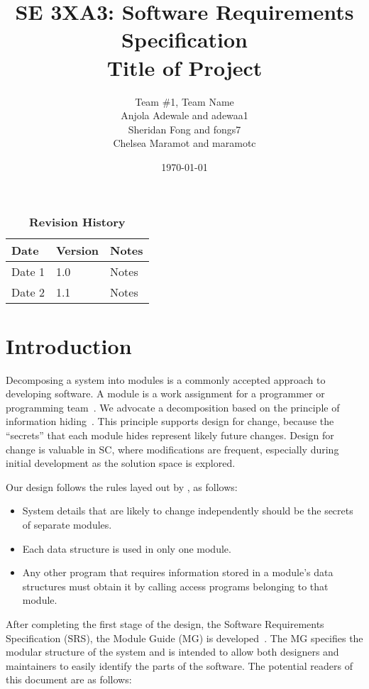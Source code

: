 \documentclass[12pt, titlepage]{article}
\title{SE 3XA3: Software Requirements Specification\\Title of Project}
\author{Team \#1, Team Name
		\\ Anjola Adewale and adewaa1
		\\ Sheridan Fong and fongs7
		\\ Chelsea Maramot and maramotc
}
\date{\today}
\begin{document}
\maketitle

\tableofcontents
\listoftables
\listoffigures

\begin{table}[H]
\caption{\bf Revision History}
\begin{tabularx}{\textwidth}{p{3cm}p{2cm}X}
\toprule {\bf Date} & {\bf Version} & {\bf Notes}\\
\midrule
Date 1 & 1.0 & Notes\\
Date 2 & 1.1 & Notes\\
\bottomrule
\end{tabularx}
\end{table}

\newpage


\section{Introduction}

Decomposing a system into modules is a commonly accepted approach to developing
software.  A module is a work assignment for a programmer or programming
team~\citep{ParnasEtAl1984}.  We advocate a decomposition
based on the principle of information hiding~\citep{Parnas1972a}.  This
principle supports design for change, because the ``secrets'' that each module
hides represent likely future changes.  Design for change is valuable in SC,
where modifications are frequent, especially during initial development as the
solution space is explored.  

Our design follows the rules layed out by \citet{ParnasEtAl1984}, as follows:
\begin{itemize}
\item System details that are likely to change independently should be the
  secrets of separate modules.
\item Each data structure is used in only one module.
\item Any other program that requires information stored in a module's data
  structures must obtain it by calling access programs belonging to that module.
\end{itemize}

After completing the first stage of the design, the Software Requirements
Specification (SRS), the Module Guide (MG) is developed~\citep{ParnasEtAl1984}. The MG
specifies the modular structure of the system and is intended to allow both
designers and maintainers to easily identify the parts of the software.  The
potential readers of this document are as follows:
\end{document}
